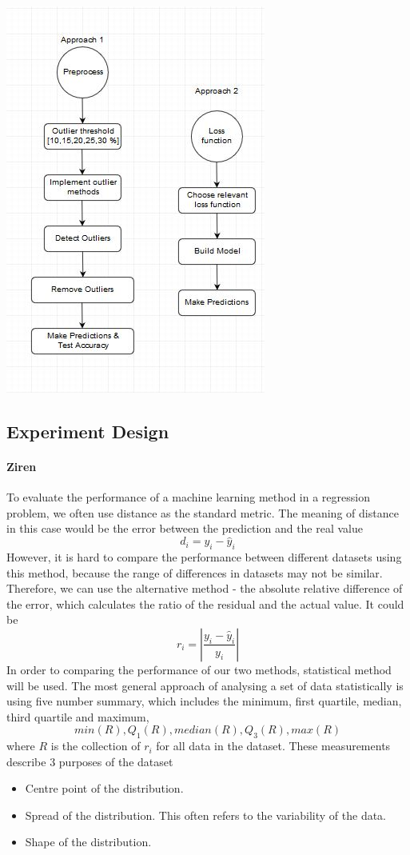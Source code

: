 \documentclass[runningheads]{llncs}
\begin{document}
\includegraphics[scale=0.7]{arch.JPG}

\subsection{Experiment Design}

\paragraph{Ziren}To evaluate the performance of a machine learning method in a regression problem, we often use distance as the standard metric. The meaning of distance in this case would be the error between the prediction and the real value
\[d_i=y_i-\hat{y}_i\]
However, it is hard to compare the performance between different datasets using this method, because the range of differences in datasets may not be similar. Therefore, we can use the alternative method - the absolute relative difference of the error, which calculates the ratio of the residual and the actual value. It could be
\begin{equation}
    r_i = |\frac{y_i-\hat{y}_i}{y_i}|
\end{equation}
In order to comparing the performance of our two methods, statistical method will be used. The most general approach of analysing a set of data statistically is using five number summary, which includes the minimum, first quartile, median, third quartile and maximum,
\begin{equation}
    min(R), Q_1(R), median(R), Q_3(R), max(R)
\end{equation}
where $R$ is the collection of $r_i$ for all data in the dataset. These measurements describe 3 purposes of the dataset
\begin{itemize}
    \item Centre point of the distribution. 
    \item Spread of the distribution. This often refers to the variability of the data. 
    \item Shape of the distribution.
\end{itemize}
\end{document}
